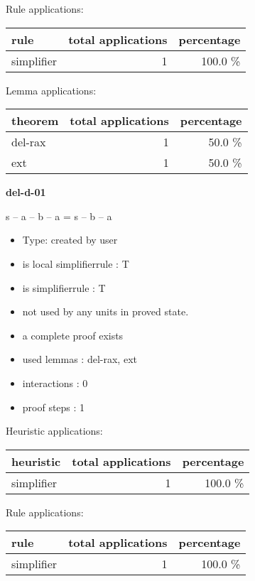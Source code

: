 \documentclass[a4paper]{article}
\begin{document}
Rule applications:

\begin{supertabular}{l|r|r}
rule	        & total applications & percentage \\ \hline
simplifier & 1 & 100.0 \% \\

\end{supertabular}

Lemma applications:

\begin{supertabular}{l|r|r}
theorem	        & total applications & percentage \\ \hline
del-rax & 1 & 50.0 \% \\
ext & 1 & 50.0 \% \\

\end{supertabular}
\pagebreak

{\LARGE\bf del-d-01}\label{lemma-del-d-01}

\medskip

 \Fol s -- a -- b -- a = s -- b -- a

\begin{itemize}

\item Type: created by user

\item is local simplifierrule : T
\item is simplifierrule : T
\item not used by any units in proved state.
\item       a complete proof exists
\item       used lemmas  : del-rax, ext
\item       interactions : 0
\item       proof steps  : 1
\end{itemize}

\medskip


Heuristic applications:

\begin{supertabular}{l|r|r}
heuristic	& total applications & percentage \\ \hline
simplifier & 1 & 100.0 \% \\

\end{supertabular}

Rule applications:

\begin{supertabular}{l|r|r}
rule	        & total applications & percentage \\ \hline
simplifier & 1 & 100.0 \% \\

\end{supertabular}
\end{document}
